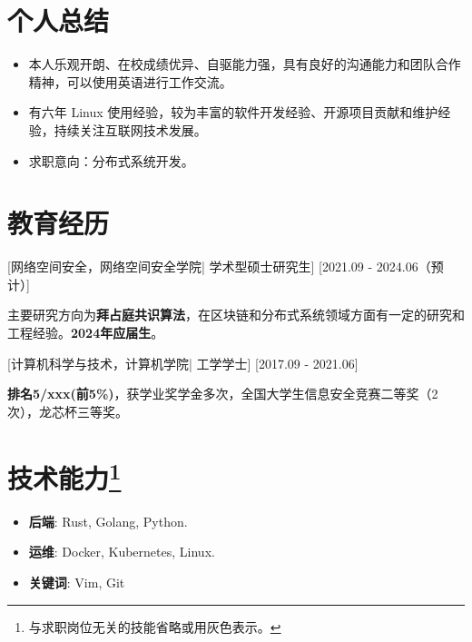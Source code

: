 \documentclass{resume}
\begin{document}

\ResumeTitle

\section{个人总结}

\begin{itemize}
  \item 本人乐观开朗、在校成绩优异、自驱能力强，具有良好的沟通能力和团队合作精神，可以使用英语进行工作交流。
  \item 有六年 Linux 使用经验，较为丰富的软件开发经验、开源项目贡献和维护经验，持续关注互联网技术发展。
  \item 求职意向：分布式系统开发。
\end{itemize}

\section{教育经历}
[\textnormal{网络空间安全，网络空间安全学院|}  学术型硕士研究生]
[2021.09 - 2024.06（预计）]

主要研究方向为\textbf{拜占庭共识算法}，在区块链和分布式系统领域方面有一定的研究和工程经验。\textbf{2024年应届生}。

[\textnormal{计算机科学与技术，计算机学院|} 工学学士]
[2017.09 - 2021.06]

\textbf{排名5/xxx(前5\%)}，获学业奖学金多次，全国大学生信息安全竞赛二等奖（2次），龙芯杯三等奖。


\section[技术能力]{技术能力\protect\footnote{与求职岗位无关的技能省略或用灰色表示。}}
\begin{itemize}
  \item \textbf{后端}: Rust, Golang, Python.
  \item \textbf{运维}: Docker, Kubernetes, Linux.
%
  \item \textbf{关键词}: Vim, Git
\end{itemize}
\end{document}
